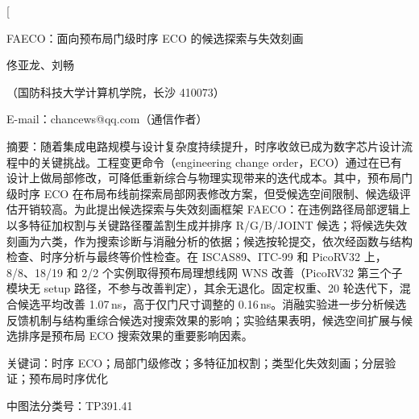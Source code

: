 \documentclass[twocolumn,10pt,fontset=windows]{ctexart}
\let\songti\songfamily\let\heiti\heifamily\let\fangsong\fangfamily
\begin{document}
\pagestyle{plain}

\twocolumn[
\vspace*{-0.25cm}
\begin{center}
{\heiti{} FAECO：面向预布局门级时序 ECO 的候选探索与失效刻画}\par
\vspace{6pt}
{\fangsong{} 佟亚龙、刘畅}\par
\vspace{4pt}
{\songti\fontsize{8}{12}\selectfont（国防科技大学计算机学院，长沙 410073）}\par\vspace{2pt}
{\songti\fontsize{8}{12}\selectfont E-mail：chancews@qq.com（通信作者）}\par
\vspace{6pt}
\end{center}
\begin{flushleft}
  {\heiti\fontsize{8.5}{13}\selectfont 摘\quad 要：}{\songti\fontsize{8.5}{13}\selectfont 随着集成电路规模与设计复杂度持续提升，时序收敛已成为数字芯片设计流程中的关键挑战。工程变更命令（engineering change order，ECO）通过在已有设计上做局部修改，可降低重新综合与物理实现带来的迭代成本。其中，预布局门级时序 ECO 在布局布线前探索局部网表修改方案，但受候选空间限制、候选级评估开销较高。为此提出候选探索与失效刻画框架 FAECO：在违例路径局部逻辑上以多特征加权割与关键路径覆盖割生成并排序 R/G/B/JOINT 候选；将候选失效刻画为六类，作为搜索诊断与消融分析的依据；候选按轮提交，依次经函数与结构检查、时序分析与最终等价性检查。在 ISCAS89、ITC-99 和 PicoRV32 上，8/8、18/19 和 2/2 个实例取得预布局理想线网 WNS 改善（PicoRV32 第三个子模块无 setup 路径，不参与改善判定），其余无退化。固定权重、20 轮迭代下，混合候选平均改善 1.07\,ns，高于仅门尺寸调整的 0.16\,ns。消融实验进一步分析候选反馈机制与结构重综合候选对搜索效果的影响；实验结果表明，候选空间扩展与候选排序是预布局 ECO 搜索效果的重要影响因素。}
\par
\vspace{4pt}
{\heiti\fontsize{8.5}{13}\selectfont 关键词：}{\songti\fontsize{8.5}{13}\selectfont 时序 ECO；局部门级修改；多特征加权割；类型化失效刻画；分层验证；预布局时序优化}\par
\vspace{2pt}
{\songti\fontsize{8.5}{13}\selectfont 中图法分类号：TP391.41}\par
\vspace{3pt}
\end{flushleft}
\end{document}
